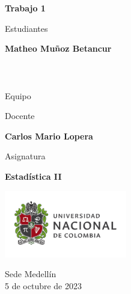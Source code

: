 \begin{titlepage}
   \Large{
   \begin{center}
       \vspace*{1cm}

       \textbf{Trabajo 1}

            
       \vspace{1.5cm}
       
       Estudiantes
       
       \vspace{0.5cm}
        
	\textbf{Matheo Muñoz Betancur}\\    

  \textbf{}\\

	\textbf{}\\

	\textbf{}\\
	

              \vspace{1cm}
      Equipo 
       
       Docente
       
       \vspace{0.5cm}

       \textbf{Carlos Mario Lopera}
       
       \vspace{0.4cm}

       \vspace{1.4cm}
       
       Asignatura
       
       \vspace{0.5cm}

       \textbf{Estadística II}

       \vfill

            
     
       \includegraphics[width=0.4\textwidth]{logounal.png}
            
       Sede Medellín\\
       5 de octubre de 2023
       
   \end{center}
   }
\end{titlepage}